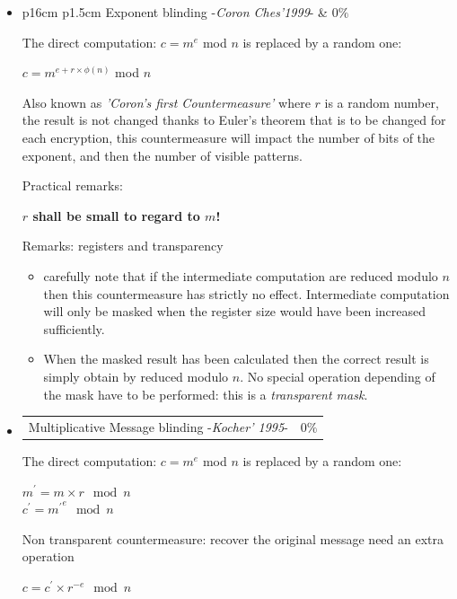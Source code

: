 \begin{itemize}
\item	\begin{tabularx}{\linewidth}{ p{16cm} p{1.5cm}}
		Exponent blinding -\textit{Coron Ches'1999}-  & $0\%$ \\ 
		\end{tabularx}	
		\noindent 
		The direct computation: $c = m^e$ mod $n$ is replaced by a random one:
			\begin{center}
			$c = m^{e+r \times \phi (n) }$ mod $n$\\
		\end{center}
		Also known as \textit{'Coron's first Countermeasure'} where $r$ is a random number, the result is not changed thanks to Euler's theorem that is to be changed for each encryption, this countermeasure will impact the number of bits of the exponent, and then the number of visible patterns.

		Practical remarks: 
		\begin{center}
			\textbf{$r$ shall be small to regard to $m$!}
		\end{center}

		Remarks: registers and transparency
		\begin{itemize}
			\item carefully note that if the intermediate computation are reduced modulo $n$
			then this countermeasure has strictly no effect. Intermediate computation will only be 
			masked when the register size would have been increased sufficiently.
			\item When the masked result has been calculated then the correct result is 
			simply obtain by reduced modulo $n$. No special operation depending of the mask 
			have to be performed: this is a \textit{transparent mask}.
		\end{itemize}



\item	\begin{tabularx}{\linewidth}{ p{16cm} p{1.5cm}}
		Multiplicative Message blinding -\textit{Kocher' 1995}-  & $0\%$\\ 
		\end{tabularx}	
		\noindent 
		The direct computation: $c = m^e$ mod $n$ is replaced by a random one:
		\begin{center}
		$m^{'} = m \times r \mod n$\\
		$c^{'} = {m^{'}}^e \mod n$
		\end{center}
		Non transparent countermeasure: recover the original message need an extra operation
		\begin{center}
		$ c  = c^{'} \times {r}^{-e} \mod n$
		\end{center}


\end{itemize}
